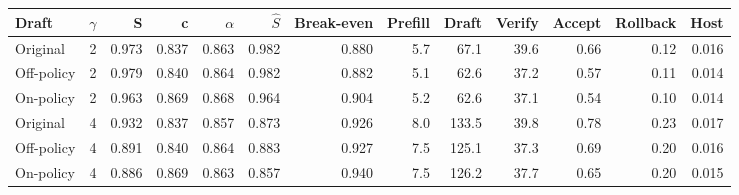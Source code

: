 \scriptsize
\setlength{\tabcolsep}{3.5pt}
\label{tab:t3speedupmean}
\begin{adjustbox}{max width=\linewidth}
\begin{tabular}{lrrrrrrrrrrrr}
\toprule
Draft & $\gamma$ & S & c & $\alpha$ & $\hat S$ & Break-even & Prefill & Draft & Verify & Accept & Rollback & Host \\
\midrule
Original & 2 & 0.973 & 0.837 & 0.863 & 0.982 & 0.880 & 5.7 & 67.1 & 39.6 & 0.66 & 0.12 & 0.016 \\
Off-policy & 2 & 0.979 & 0.840 & 0.864 & 0.982 & 0.882 & 5.1 & 62.6 & 37.2 & 0.57 & 0.11 & 0.014 \\
On-policy & 2 & 0.963 & 0.869 & 0.868 & 0.964 & 0.904 & 5.2 & 62.6 & 37.1 & 0.54 & 0.10 & 0.014 \\
\midrule
Original & 4 & 0.932 & 0.837 & 0.857 & 0.873 & 0.926 & 8.0 & 133.5 & 39.8 & 0.78 & 0.23 & 0.017 \\
Off-policy & 4 & 0.891 & 0.840 & 0.864 & 0.883 & 0.927 & 7.5 & 125.1 & 37.3 & 0.69 & 0.20 & 0.016 \\
On-policy & 4 & 0.886 & 0.869 & 0.863 & 0.857 & 0.940 & 7.5 & 126.2 & 37.7 & 0.65 & 0.20 & 0.015 \\
\bottomrule
\end{tabular}
\end{adjustbox}
